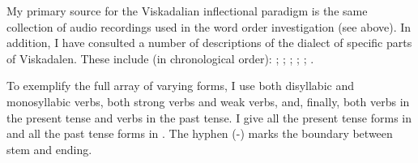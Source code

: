 \documentclass[output=paper,colorlinks,citecolor=brown,draft,draftmode]{langscibook}
\begin{document}
My primary source for the Viskadalian inflectional paradigm is the same collection of audio recordings used in the word order investigation (see  above). In addition, I have consulted a number of descriptions of the dialect of specific parts of Viskadalen. These include (in chronological order): \citet{Moller1858}; \citet{Belfrage1871}; \citet{Andersson1922}; \citet{Kalen1923}; \citet{Lindberg1927}; \citet{GotlindLandtmanson1950}.



To exemplify the full array of varying forms, I use both disyllabic and monosyllabic verbs, both strong verbs and weak verbs, and, finally, both verbs in the present tense and verbs in the past tense. I give all the present tense forms in  and all the past tense forms in . The hyphen (-) marks the boundary between stem and ending.


\begin{table}
\caption{\label{tab:petzell:2a}Viskadalian present tense inflection}
\end{table}
\end{document}
